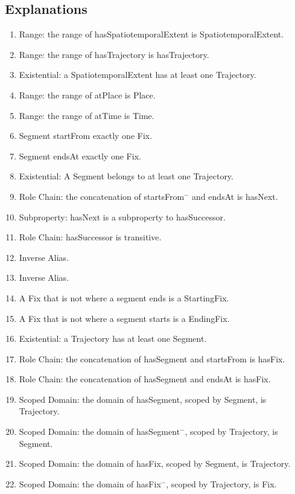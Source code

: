 \subsection{Explanations}
\label{exp:Spatiotemporal}
\begin{enumerate}
\item Range: the range of \textsf{hasSpatiotemporalExtent} is \textsf{SpatiotemporalExtent}.
\item Range: the range of \textsf{hasTrajectory} is \textsf{hasTrajectory}.
\item Existential: a \textsf{SpatiotemporalExtent} has at least one \textsf{Trajectory}.
\item Range: the range of \textsf{atPlace} is \textsf{Place}.
\item Range: the range of \textsf{atTime} is \textsf{Time}.
\item \textsf{Segment} \textsf{startFrom} exactly one \textsf{Fix}.
\item \textsf{Segment} \textsf{endsAt} exactly one \textsf{Fix}.
\item Existential: A \textsf{Segment} belongs to at least one \textsf{Trajectory}.
\item Role Chain: the concatenation of \textsf{startsFrom}$^-$ and \textsf{endsAt} is \textsf{hasNext}.
\item Subproperty: \textsf{hasNext} is a subproperty to \textsf{hasSuccessor}.
\item Role Chain: \textsf{hasSuccessor} is transitive.
\item Inverse Alias.
\item Inverse Alias.
\item A \textsf{Fix} that is not where a segment ends is a \textsf{StartingFix}.
\item A \textsf{Fix} that is not where a segment starts is a \textsf{EndingFix}.
\item Existential: a \textsf{Trajectory} has at least one \textsf{Segment}.
\item Role Chain: the concatenation of \textsf{hasSegment} and \textsf{startsFrom} is \textsf{hasFix}.
\item Role Chain: the concatenation of \textsf{hasSegment} and \textsf{endsAt} is \textsf{hasFix}.
\item Scoped Domain: the domain of \textsf{hasSegment}, scoped by \textsf{Segment}, is \textsf{Trajectory}.
\item Scoped Domain: the domain of \textsf{hasSegment}$^-$, scoped by \textsf{Trajectory}, is \textsf{Segment}.
\item Scoped Domain: the domain of \textsf{hasFix}, scoped by \textsf{Segment}, is \textsf{Trajectory}.
\item Scoped Domain: the domain of \textsf{hasFix}$^-$, scoped by \textsf{Trajectory}, is \textsf{Fix}.
\end{enumerate}

